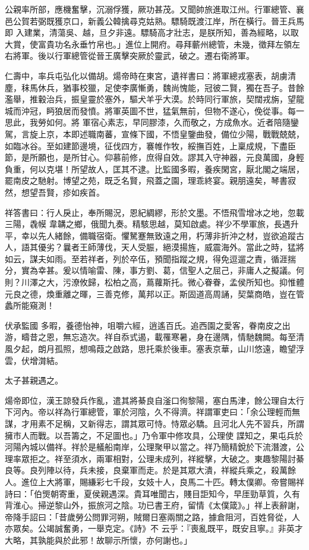\begin{pinyinscope}
 公親率所部，應機奮擊，沉溺俘獲，厥功甚茂。又聞帥旅進取江州。行軍總管、襄邑公賀若弼既獲京口，新義公韓擒尋克姑熟。驃騎既渡江岸，所在橫行。晉王兵馬即
 入建業，清蕩吳、越，旦夕非遠。驃騎高才壯志，是朕所知，善為經略，以取大賞，使富貴功名永垂竹帛也。」進位上開府。尋拜蘄州總管，未幾，徵拜左領左右將軍。後以行軍總管從晉王廣擊突厥於靈武，破之。遷右衛將軍。



 仁壽中，率兵屯弘化以備胡。煬帝時在東宮，遺祥書曰：將軍總戎塞表，胡虜清塵，秣馬休兵，猶事校獵，足使李廣慚勇，魏尚愧能，冠彼二賢，獨在吾子。昔餘濫舉，推轂治兵，振皇靈於塞外，驅犬羊乎大漠。於時同行軍旅，契闊戎旃，望龍城而沖冠，眄狼居而發憤。將軍英圖不世，猛氣無前，但物不遂心，俛從事。每一思此，我勞如何。將
 軍宿心素志，早同膠漆，久而敬之，方成魚水。近者陪隨鑾駕，言旋上京，本即述職南蕃，宣條下國，不悟皇鑒曲發，備位少陽，戰戰兢兢，如臨冰谷。至如建節邊境，征伐四方，褰帷作牧，綏撫百姓，上稟成規，下盡臣節，是所願也，是所甘心。仰慕前修，庶得自效。謬其入守神器，元良萬國，身輕負重，何以克堪！所望故人，匡其不逮。比監國多暇，養疾閑宮，厭北閣之端居，罷南皮之馳射。博望之苑，既乏名賢，飛蓋之園，理乖終宴。親朋遠矣，琴書寂然，想望吾賢，疹如疾首。



 祥答書曰：行人戾止，奉所賜況，恩紀綢繆，形於文墨。不悟飛雪增冰之地，忽載三陽，毳幙
 韋韝之鄉，俄聞九奏。精駭思越，莫知啟處。祥少不學軍旅，長遇升平，幸以先人緒餘，備職宿衛。懼駑蹇無致遠之用，朽薄非折沖之材，豈欲追蹤古人，語其優劣？曩者王師薄伐，天人受脤，絕漠揚旌，威震海外。當此之時，猛將如云，謀夫如雨。至若祥者，列於卒伍，預聞指蹤之規，得免逗遛之責，循涯揣分，實為幸甚。爰以情喻雷、陳，事方劉、葛，信聖人之屈己，非庸人之擬議。何則？川澤之大，污潦攸歸，松柏之高，蔦蘿斯托。微心眷眷，孟侯所知也。抑惟體元良之德，煥重離之暉，三善克修，萬邦以正。斯固道高周誦，契葉商皓，豈在管蠡所能窺測！



 伏承監國
 多暇，養德怡神，咀嚼六經，逍遙百氏。追西園之愛客，眷南皮之出游，疇昔之恩，無忘造次。祥自忝式遏，載罹寒暑，身在邊隅，情馳魏闕。每至清風夕起，朗月孤照，想鳴葭之啟路，思托乘於後車。塞表京華，山川悠遠，瞻望浮雲，伏增潸結。



 太子甚親遇之。



 煬帝即位，漢王諒發兵作亂，遣其將綦良自滏口徇黎陽，塞白馬津，餘公理自太行下河內。帝以祥為行軍總管，軍於河陰，久不得濟。祥謂軍吏曰：「余公理輕而無謀，才用素不足稱，又新得志，謂其眾可恃。恃眾必驕。且河北人先不習兵，所謂擁市人而戰。以吾籌之，不足圖也。」乃令軍中修攻具，公理使
 諜知之，果屯兵於河陽內城以備祥。祥於是艤船南岸，公理聚甲以當之。祥乃簡精銳於下流潛渡，公理率眾拒之。祥至須水，兩軍相對，公理未成列，祥縱擊，大破之。東趣黎陽討綦良等。良列陣以待，兵未接，良棄軍而走。於是其眾大潰，祥縱兵乘之，殺萬餘人。進位上大將軍，賜縑彩七千段，女妓十人，良馬二十匹。轉太僕卿。帝嘗賜祥詩曰：「伯煚朝寄重，夏侯親遇深。貴耳唯聞古，賤目詎知今，早厓勁草質，久有背淮心。掃逆黎山外，振旅河之陰。功已書王府，留情《太僕箴》。」祥上表辭謝，帝降手詔曰：「昔歲勞公問罪河朔，賊爾日塞兩關之路，據倉阻河，百姓脅從，人亦眾矣。公竭誠奮勇，一舉克定。《詩》不
 云乎：『喪亂既平，既安且寧。』非英才大略，其孰能與於此邪！故聊示所懷，亦何謝也。」




\end{pinyinscope}
